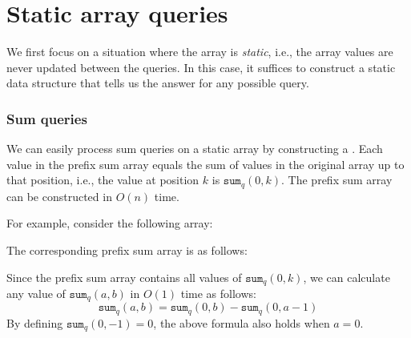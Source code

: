 \section{Static array queries}

We first focus on a situation where
the array is \emph{static}, i.e.,
the array values are never updated between the queries.
In this case, it suffices to construct
a static data structure that tells us
the answer for any possible query.

\subsubsection{Sum queries}


We can easily process
sum queries on a static array
by constructing a .
Each value in the prefix sum array equals
the sum of values in the original array up to that position,
i.e., the value at position $k$ is $\texttt{sum}_q(0,k)$.
The prefix sum array can be constructed in $O(n)$ time.

For example, consider the following array:
\begin{center}
\end{center}
The corresponding prefix sum array is as follows:
\begin{center}
\end{center}
Since the prefix sum array contains all values
of $\texttt{sum}_q(0,k)$,
we can calculate any value of
$\texttt{sum}_q(a,b)$ in $O(1)$ time as follows:
\[ \texttt{sum}_q(a,b) = \texttt{sum}_q(0,b) - \texttt{sum}_q(0,a-1)\]
By defining $\texttt{sum}_q(0,-1)=0$,
the above formula also holds when $a=0$.

